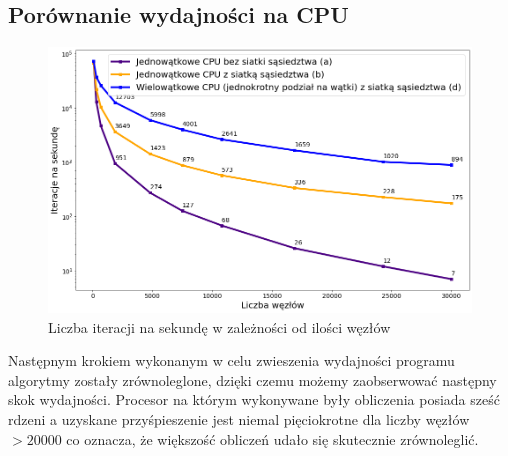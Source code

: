 \documentclass[12pt, letterpaper]{report}
\begin{document}
    \subsection{Porównanie wydajności na CPU}
    \begin{figure}[H]
        \centering
        \includegraphics[width=16cm]{performance_cpu_best_worst.png}
        \caption{
            Liczba iteracji na sekundę w zależności od ilości węzłów
        }
    \end{figure}
    Następnym krokiem wykonanym w celu zwieszenia wydajności programu algorytmy zostały 
    zrównoleglone, dzięki czemu możemy zaobserwować następny skok wydajności. Procesor na którym 
    wykonywane były obliczenia posiada sześć rdzeni a uzyskane przyśpieszenie jest niemal pięciokrotne
    dla liczby węzłów $>20000$ co oznacza, że większość obliczeń udało się skutecznie zrównoleglić.

\end{document}
